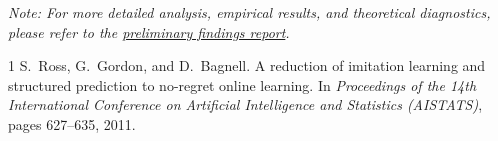 \documentclass[11pt, a4paper]{article}
\begin{document}
\vspace{1em}
\noindent\textit{Note: For more detailed analysis, empirical results, and theoretical diagnostics, please refer to the \href{https://github.com/Vab-jain/eg_bdqn/blob/main/report/preliminary_findings/preliminary_findings.pdf}{preliminary findings report}.}


\begin{thebibliography}{1}
S.~Ross, G.~Gordon, and D.~Bagnell.
\newblock A reduction of imitation learning and structured prediction to no-regret online learning.
\newblock In \textit{Proceedings of the 14th International Conference on Artificial Intelligence and Statistics (AISTATS)}, pages 627--635, 2011.
\end{thebibliography}
\end{document}
